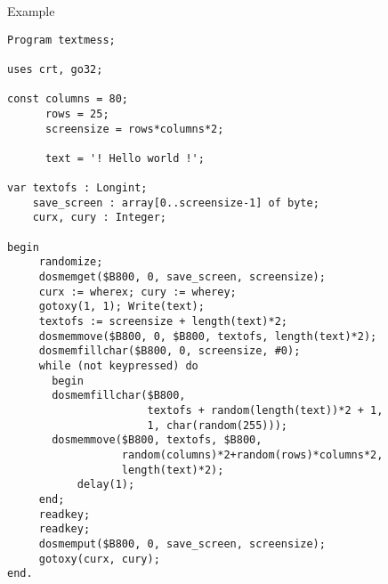 \begin{FPCList}
\item[Example]
\begin{verbatim}
Program textmess;

uses crt, go32;

const columns = 80;
      rows = 25; 
      screensize = rows*columns*2;

      text = '! Hello world !'; 

var textofs : Longint;
    save_screen : array[0..screensize-1] of byte;
    curx, cury : Integer;

begin
     randomize;
     dosmemget($B800, 0, save_screen, screensize);
     curx := wherex; cury := wherey;
     gotoxy(1, 1); Write(text);
     textofs := screensize + length(text)*2;
     dosmemmove($B800, 0, $B800, textofs, length(text)*2);
     dosmemfillchar($B800, 0, screensize, #0);
     while (not keypressed) do 
       begin
       dosmemfillchar($B800, 
                      textofs + random(length(text))*2 + 1,
                      1, char(random(255)));
       dosmemmove($B800, textofs, $B800,
                  random(columns)*2+random(rows)*columns*2,
                  length(text)*2);
           delay(1);
     end;
     readkey;
     readkey;
     dosmemput($B800, 0, save_screen, screensize);
     gotoxy(curx, cury);
end.\end{verbatim}
\end{FPCList}
